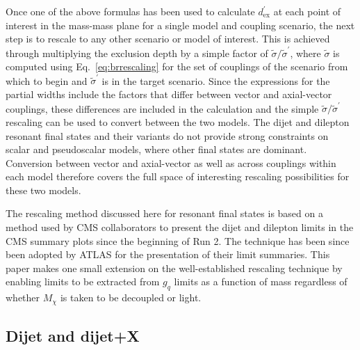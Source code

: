 \documentclass[a4paper, 11pt]{article}
\newcommand{\mdm}{\ensuremath{M_{\chi}}\xspace}
\begin{document}
Once one of the above formulas has been used to calculate $d_\text{ex}^\prime$ at each point of interest in the mass-mass plane for a single model and coupling scenario, the next step is to rescale to any other scenario or model of interest. This is achieved through multiplying the exclusion depth by a simple factor of $\tilde{\sigma}/\tilde{\sigma}^\prime$, where $\tilde{\sigma}$ is computed using Eq.~\ref{eq:brrescaling} for the set of couplings of the scenario from which to begin and $\tilde{\sigma}^\prime$ is in the target scenario.
Since the expressions for the partial widths include the factors that differ between vector and axial-vector couplings, these differences are included in the calculation and the simple $\tilde{\sigma}/\tilde{\sigma}^\prime$ rescaling can be used to convert between the two models. The dijet and dilepton resonant final states and their variants do not provide strong constraints on scalar and pseudoscalar models, where other final states are dominant. Conversion between vector and axial-vector as well as across couplings within each model therefore covers the full space of interesting rescaling possibilities for these two models.

The rescaling method discussed here for resonant final states is based on a method used by CMS collaborators to present the dijet and dilepton limits in the CMS summary plots since the beginning of Run 2.
The technique has been since been adopted by ATLAS for the presentation of their limit summaries. This paper makes one small extension on the well-established rescaling technique by enabling limits to be extracted from $g_q$ limits as a function of mass regardless of whether \mdm is taken to be decoupled or light. 

\subsection{Dijet and dijet+X}
\label{subsec:dijet}
\end{document}
